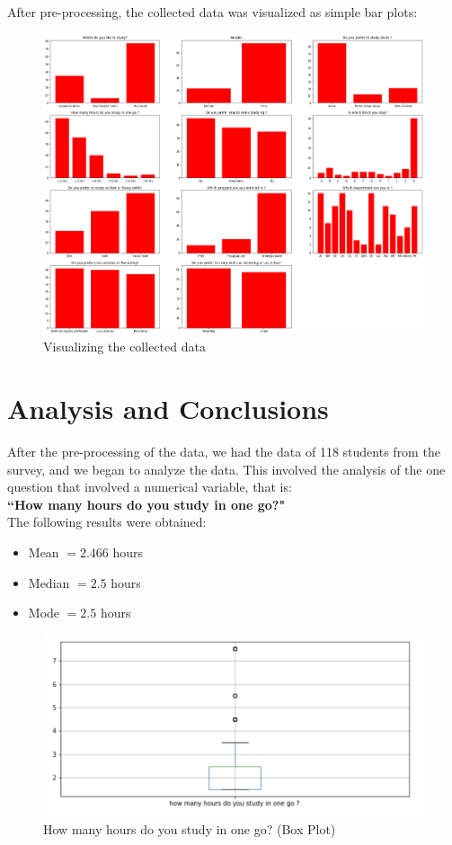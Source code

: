 \documentclass[12pt,onecolumn,letterpaper]{article}
\begin{document}
\hspace{0.3in} After pre-processing, the collected data was visualized as simple bar plots:
\begin{figure}[h]
    \centering
    \includegraphics[scale=0.29]{output1.png}
    \caption{Visualizing the collected data}
    \label{fig:Visualized_data}
\end{figure}

\newpage
\section{Analysis and Conclusions}
\hspace{0.3in} After the pre-processing of the data, we had the data of 118 students from the survey, and we began to analyze the data. This involved the analysis of the one question that involved a numerical variable, that is: \\ \textbf{``How many hours do you study in one go?"}\\
The following results were obtained:
\begin{itemize}
    \item Mean $= 2.466$ hours
    \item Median $= 2.5$ hours
    \item Mode $= 2.5$ hours
\end{itemize}

\begin{figure}[h]
    \centering
    \includegraphics[scale=0.7]{output3.1.png}
    \caption{How many hours do you study in one go? (Box Plot)}
    \label{fig:study_hours}
\end{figure}
\end{document}
